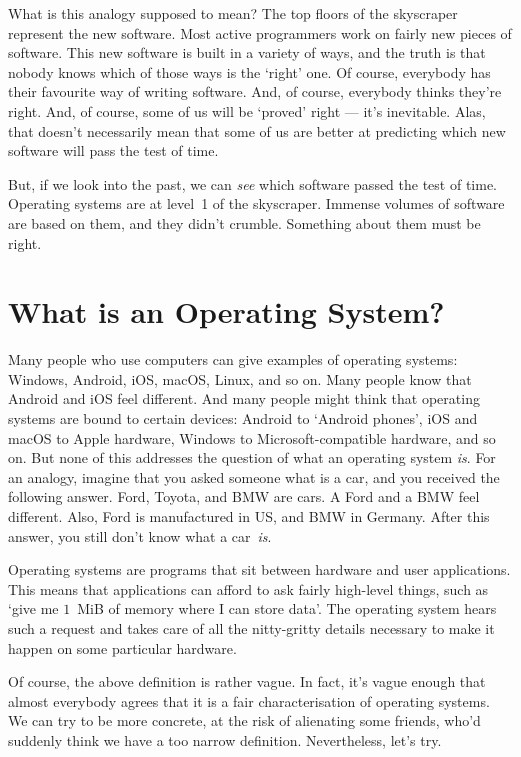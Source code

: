 What is this analogy supposed to mean?
The top floors of the skyscraper represent the new software.
Most active programmers work on fairly new pieces of software.
This new software is built in a variety of ways,
  and the truth is that nobody knows which of those ways is the `right' one.
Of course, everybody has their favourite way of writing software.
And, of course, everybody thinks they're right.
And, of course, some of us will be `proved' right --- it's inevitable.
Alas, that doesn't necessarily mean that some of us are better at predicting
  which new software will pass the test of time.

But, if we look into the past, we can \emph{see} which software passed the test of time.
Operating systems are at level~1 of the skyscraper.
Immense volumes of software are based on them, and they didn't crumble.
Something about them must be right.

\section{What is an Operating System?}

Many people who use computers can give examples of operating systems:
  Windows, Android, iOS, macOS, Linux, and so on.
Many people know that Android and iOS feel different.
And many people might think that operating systems are bound to certain devices:
  Android to `Android phones',
  iOS and macOS to Apple hardware,
  Windows to Microsoft-compatible hardware,
  and so on.
But none of this addresses the question of what an operating system \emph{is}.
For an analogy,
  imagine that you asked someone what is a car,
  and you received the following answer.
Ford, Toyota, and BMW are cars.
A Ford and a BMW feel different.
Also, Ford is manufactured in US, and BMW in Germany.
After this answer,
  you still don't know what a car~\emph{is}.

\medskip

Operating systems are programs that sit between hardware and user applications.
This means that applications can afford to ask fairly high-level things,
  such as `give me $1$~MiB of memory where I can store data'.
The operating system hears such a request and takes care of all the nitty-gritty details
  necessary to make it happen on some particular hardware.

Of course, the above definition is rather vague.
In fact,
  it's vague enough that almost everybody agrees
  that it is a fair characterisation of operating systems.
We can try to be more concrete, at the risk of alienating some friends,
  who'd suddenly think we have a too narrow definition.
Nevertheless, let's try.

